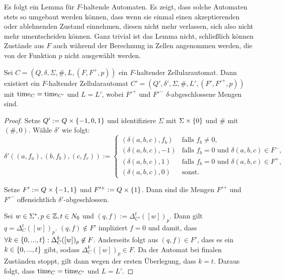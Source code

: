 Es folgt ein Lemma für $F$-haltende Automaten. Es zeigt, dass solche Automaten stets so umgebaut werden können,
dass wenn sie einmal einen akzeptierenden oder ablehnenden Zustand einnehmen, diesen nicht mehr verlassen, sich also nicht mehr umentscheiden können.
Ganz trivial ist das Lemma nicht, schließlich können Zustände aus $F$ auch während der Berechnung in Zellen angenommen werden,
die von der Funktion $p$ nicht ausgewählt werden.

\begin{lemma}
    \label{lemmaAbgeschlosseneMenge}
    
    Sei $C = (Q, \delta, \Sigma, \#, L, (F, F^+, p))$ ein $F$-haltender Zellularautomat.
    Dann existiert ein $F$-haltender Zellularautomat $C' = (Q', \delta', \Sigma, \#, L', (F', F'^+, p))$ mit $\operatorname{time}_{C} = \operatorname{time}_{C'}$ und $L = L'$,
    wobei $F'^+$ und $F'^-$ $\delta$-abgeschlossene Mengen sind.
\end{lemma}
\begin{proof}
    Setze $Q' := Q \times \{ {{-1}, 0, 1} \}$ und identifiziere $\Sigma$ mit $\Sigma \times \{ {0} \}$ und $\#$ mit $(\#, 0)$.
    Wähle $\delta'$ wie folgt:
    \[
       \delta'((a, f_a), (b, f_b), (c, f_c)) :=
       \begin{cases}
         (\delta(a, b, c), f_b)  & \text{falls } f_b \neq 0, \\
         (\delta(a, b, c), {-1}) & \text{falls } f_b = 0 \text{ und } \delta(a, b, c) \in F^-, \\
         (\delta(a, b, c), {1}) & \text{falls } f_b = 0 \text{ und }  \delta(a, b, c) \in F^+, \\
         (\delta(a, b, c), {0}) & \text{sonst.}
       \end{cases}
    \]
    
    Setze $F' := Q \times \{ {{-1}, 1} \}$ und $F'^+ := Q \times \{ {1} \}$.
    Dann sind die Mengen $F'^+$ und $F'^-$ offensichtlich $\delta'$-abgeschlossen.
    
    Sei $w \in \Sigma^*, p \in \mathbb{Z}, t \in N_0$ und $(q, f) := \Delta_{C'}^t([w])_p$.
    Dann gilt $q = \Delta_{C}^t([w])_p$. $(q, f) \not\in F'$ impliziert $f = 0$ und damit, dass $\forall k \in \{ { 0, ..., t } \}: \Delta_{C}^k([w])_p \not\in F$.
    Anderseits folgt aus $(q, f) \in F'$, dass es ein $k \in \{ {0, ...,  t} \}$ gibt, sodass $\Delta_{C}^k([w])_p \in F$.
    Da der Automat bei finalen Zuständen stoppt, gilt dann wegen der ersten Überlegung, dass $k = t$.
    Daraus folgt, dass $\operatorname{time}_{C} = \operatorname{time}_{C'}$ und $L = L'$.
\end{proof}


